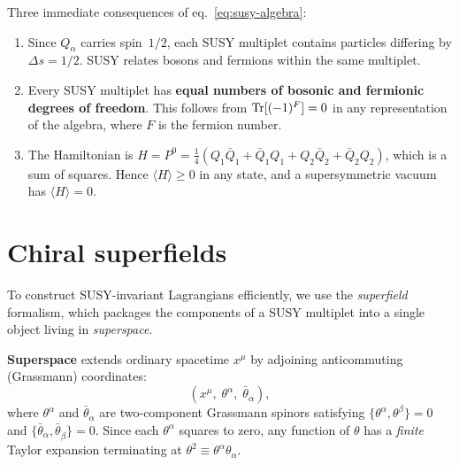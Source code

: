 \documentclass[11pt,a4paper]{article}
\begin{document}
\begin{remark}
\label{rem:susy-consequences}
Three immediate consequences of eq.~\eqref{eq:susy-algebra}:
\begin{enumerate}[label=(\alph*)]
  \item Since $Q_\alpha$ carries spin~$1/2$, each SUSY multiplet
    contains particles differing by $\Delta s = 1/2$.  SUSY relates
    bosons and fermions within the same multiplet.
  \item Every SUSY multiplet has \textbf{equal numbers of bosonic and
    fermionic degrees of freedom}.  This follows from
    $\mathrm{Tr}[(-1)^F] = 0$ in any representation of the algebra,
    where $F$ is the fermion number.
  \item The Hamiltonian is $H = P^0 = \tfrac{1}{4}(Q_1 \bar{Q}_{\dot 1}
    + \bar{Q}_{\dot 1} Q_1 + Q_2 \bar{Q}_{\dot 2}
    + \bar{Q}_{\dot 2} Q_2)$, which is a sum of squares.  Hence
    $\langle H \rangle \geq 0$ in any state, and a supersymmetric
    vacuum has $\langle H \rangle = 0$.
\end{enumerate}
\end{remark}


\section{Chiral superfields}
\label{sec:chiral}

To construct SUSY-invariant Lagrangians efficiently, we use the
\emph{superfield} formalism, which packages the components of a SUSY
multiplet into a single object living in \emph{superspace}.

\begin{definition}[Superspace]
\label{def:superspace}
\textbf{Superspace} extends ordinary spacetime $x^\mu$ by adjoining
anticommuting (Grassmann) coordinates:
\begin{equation}
  (x^\mu,\; \theta^\alpha,\; \bar\theta_{\dot\alpha}),
  \label{eq:superspace-coords}
\end{equation}
where $\theta^\alpha$ and $\bar\theta_{\dot\alpha}$ are two-component
Grassmann spinors satisfying $\{\theta^\alpha, \theta^\beta\} = 0$ and
$\{\bar\theta_{\dot\alpha}, \bar\theta_{\dot\beta}\} = 0$.  Since each
$\theta^\alpha$ squares to zero, any function of $\theta$ has a
\emph{finite} Taylor expansion terminating at $\theta^2 \equiv
\theta^\alpha \theta_\alpha$.
\end{definition}
\end{document}
